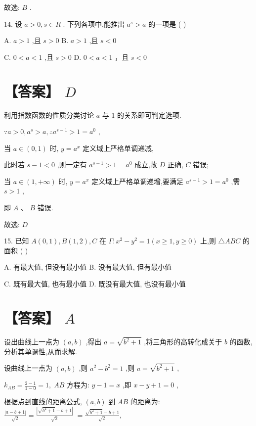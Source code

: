 \documentclass[10pt]{article}
\begin{document}
故选: \(B\) .

14. 设 \(a > 0,s \in  R\) . 下列各项中,能推出 \({a}^{s} > a\) 的一项是 ( )

A. \(a > 1\) ,且 \(s > 0\) B. \(a > 1\) ,且 \(s < 0\)

C. \(0 < a < 1\) ,且 \(s > 0\) D. \(0 < a < 1\) ，且 \(s < 0\)

\section*{【答案】 \(D\)}

利用指数函数的性质分类讨论 \(a\) 与 1 的关系即可判定选项.

\(\because a > 0,{a}^{s} > a,\therefore {a}^{s - 1} > 1 = {a}^{0}\) ,

当 \(a \in  \left( {0,1}\right)\) 时, \(y = {a}^{x}\) 定义域上严格单调递减,

此时若 \(s - 1 < 0\) ,则一定有 \({a}^{s - 1} > 1 = {a}^{0}\) 成立,故 \(D\) 正确, \(C\) 错误;

当 \(a \in  \left( {1, + \infty }\right)\) 时, \(y = {a}^{x}\) 定义域上严格单调递增,要满足 \({a}^{s - 1} > 1 = {a}^{0}\) ,需 \(s > 1\) ,

即 \(A\text{ 、 }B\) 错误.

故选: \(D\)

15. 已知 \(A\left( {0,1}\right) ,B\left( {1,2}\right) ,C\) 在 \(\Gamma  : {x}^{2} - {y}^{2} = 1\left( {x \geq  1,y \geq  0}\right)\) 上,则 \(\bigtriangleup {ABC}\) 的面积 ( )

A. 有最大值, 但没有最小值 B. 没有最大值, 但有最小值

C. 既有最大值, 也有最小值 D. 既没有最大值, 也没有最小值

\section*{【答案】 \(A\)}

设出曲线上一点为 \(\left( {a,b}\right)\) ,得出 \(a = \sqrt{{b}^{2} + 1}\) ,将三角形的高转化成关于 \(b\) 的函数, 分析其单调性,从而求解.

设曲线上一点为 \(\left( {a,b}\right)\) ,则 \({a}^{2} - {b}^{2} = 1\) ,则 \(a = \sqrt{{b}^{2} + 1}\) ,

\({k}_{AB} = \frac{2 - 1}{1 - 0} = 1,\;{AB}\) 方程为: \(y - 1 = x\) ,即 \(x - y + 1 = 0\) ,

根据点到直线的距离公式, \(\left( {a,b}\right)\) 到 \({AB}\) 的距离为: \(\frac{\left| a - b + 1\right| }{\sqrt{2}} = \frac{\left| \sqrt{{b}^{2} + 1} - b + 1\right| }{\sqrt{2}} \; = \frac{\sqrt{{b}^{2} + 1} - b + 1}{\sqrt{2}},\)
\end{document}
